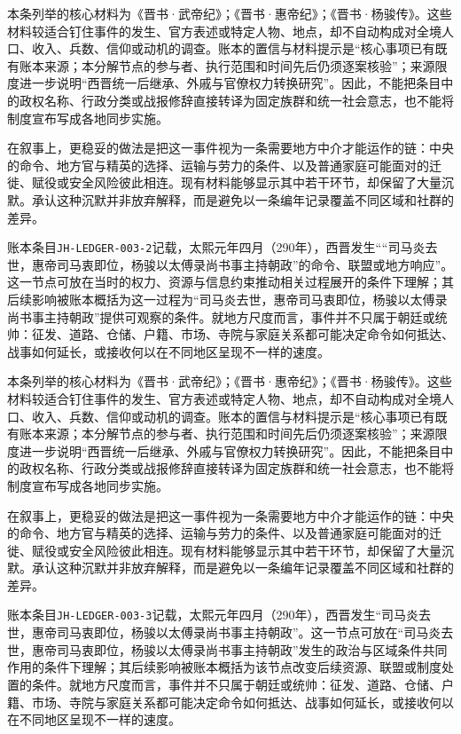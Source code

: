 本条列举的核心材料为《晋书·武帝纪》；《晋书·惠帝纪》；《晋书·杨骏传》。这些材料较适合钉住事件的发生、官方表述或特定人物、地点，却不自动构成对全境人口、收入、兵数、信仰或动机的调查。账本的置信与材料提示是“核心事项已有既有账本来源；本分解节点的参与者、执行范围和时间先后仍须逐案核验”；来源限度进一步说明“西晋统一后继承、外戚与官僚权力转换研究”。因此，不能把条目中的政权名称、行政分类或战报修辞直接转译为固定族群和统一社会意志，也不能将制度宣布写成各地同步实施。

在叙事上，更稳妥的做法是把这一事件视为一条需要地方中介才能运作的链：中央的命令、地方官与精英的选择、运输与劳力的条件、以及普通家庭可能面对的迁徙、赋役或安全风险彼此相连。现有材料能够显示其中若干环节，却保留了大量沉默。承认这种沉默并非放弃解释，而是避免以一条编年记录覆盖不同区域和社群的差异。

账本条目\texttt{JH-LEDGER-003-2}记载，太熙元年四月（290年），西晋发生““司马炎去世，惠帝司马衷即位，杨骏以太傅录尚书事主持朝政”的命令、联盟或地方响应”。这一节点可放在当时的权力、资源与信息约束推动相关过程展开的条件下理解；其后续影响被账本概括为这一过程为“司马炎去世，惠帝司马衷即位，杨骏以太傅录尚书事主持朝政”提供可观察的条件。就地方尺度而言，事件并不只属于朝廷或统帅：征发、道路、仓储、户籍、市场、寺院与家庭关系都可能决定命令如何抵达、战事如何延长，或接收何以在不同地区呈现不一样的速度。

本条列举的核心材料为《晋书·武帝纪》；《晋书·惠帝纪》；《晋书·杨骏传》。这些材料较适合钉住事件的发生、官方表述或特定人物、地点，却不自动构成对全境人口、收入、兵数、信仰或动机的调查。账本的置信与材料提示是“核心事项已有既有账本来源；本分解节点的参与者、执行范围和时间先后仍须逐案核验”；来源限度进一步说明“西晋统一后继承、外戚与官僚权力转换研究”。因此，不能把条目中的政权名称、行政分类或战报修辞直接转译为固定族群和统一社会意志，也不能将制度宣布写成各地同步实施。

在叙事上，更稳妥的做法是把这一事件视为一条需要地方中介才能运作的链：中央的命令、地方官与精英的选择、运输与劳力的条件、以及普通家庭可能面对的迁徙、赋役或安全风险彼此相连。现有材料能够显示其中若干环节，却保留了大量沉默。承认这种沉默并非放弃解释，而是避免以一条编年记录覆盖不同区域和社群的差异。

账本条目\texttt{JH-LEDGER-003-3}记载，太熙元年四月（290年），西晋发生“司马炎去世，惠帝司马衷即位，杨骏以太傅录尚书事主持朝政”。这一节点可放在“司马炎去世，惠帝司马衷即位，杨骏以太傅录尚书事主持朝政”发生的政治与区域条件共同作用的条件下理解；其后续影响被账本概括为该节点改变后续资源、联盟或制度处置的条件。就地方尺度而言，事件并不只属于朝廷或统帅：征发、道路、仓储、户籍、市场、寺院与家庭关系都可能决定命令如何抵达、战事如何延长，或接收何以在不同地区呈现不一样的速度。

